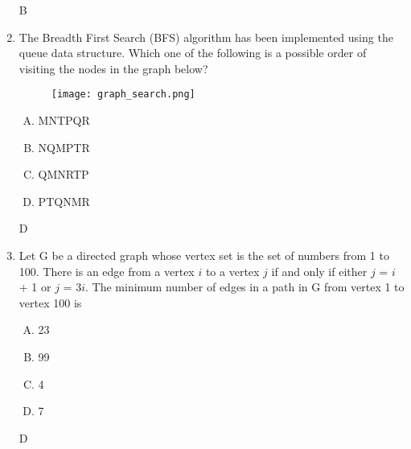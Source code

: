 \documentclass[11pt]{exam}
\begin{document}
\begin{enumerate}
          \begin{solution}
              B
          \end{solution}
    \item The Breadth First Search (BFS) algorithm has been implemented using the queue data structure. Which one of the following is a possible order of visiting the nodes in the graph below?
          \begin{figure}[H]
              \centering
              \texttt{[image: graph\_search.png]}
          \end{figure}
          \begin{enumerate}[A.]
              \item MNTPQR
              \item NQMPTR
              \item QMNRTP
              \item PTQNMR
          \end{enumerate}
          \begin{solution}
              D
          \end{solution}

    \item Let G be a directed graph whose vertex set is the set of numbers from 1 to 100. There is an edge from a vertex $i$ to a vertex $j$ if and only if either $j$ = $i$ + 1 or $j$ = 3$i$. The minimum number of edges in a path in G from vertex 1 to vertex 100 is
          \begin{enumerate}[A.]
              \item 23
              \item 99
              \item 4
              \item 7
          \end{enumerate}
          \begin{solution}
              D %
          \end{solution}
\end{enumerate}
\end{document}
